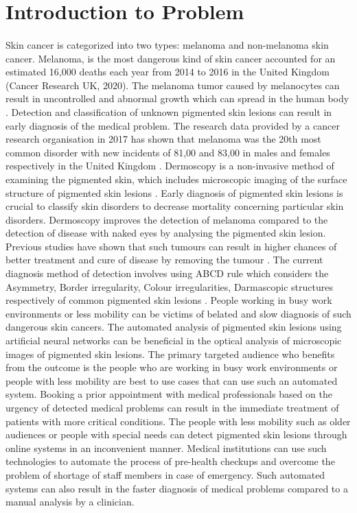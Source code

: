 \section{Introduction to Problem}
\paragraph*{}

Skin cancer is categorized into two types: melanoma and non-melanoma skin cancer. 
Melanoma, is the most dangerous kind of skin cancer accounted for an estimated 16,000 deaths 
each year from 2014 to 2016 in the United Kingdom (Cancer Research UK, 2020). 
The melanoma tumor caused by melanocytes can result in uncontrolled and abnormal growth which 
can spread in the human body \citep{KOROTKOV201269}.
Detection and classification of unknown pigmented skin lesions can result in early diagnosis 
of the medical problem. The research data provided by a cancer research organisation in 2017 has 
shown that melanoma was the 20th most common disorder with new incidents of 81,00 and 83,00 in males 
and females respectively in the United Kingdom \citep{KOROTKOV201269}. 
Dermoscopy is a non-invasive method of examining the pigmented skin, which includes microscopic imaging of the surface structure of pigmented
skin lesions \citep{KOROTKOV201269}.
Early diagnosis of pigmented skin lesions is crucial to classify skin disorders to decrease mortality concerning particular skin disorders. Dermoscopy improves the detection of melanoma compared to the detection of disease with naked eyes by analysing the pigmented skin lesion. Previous studies have shown that such tumours can result in higher chances of better treatment and cure of disease by removing the tumour \citep{CELEBI2007362}.
The current diagnosis method of detection involves using ABCD rule which considers the Asymmetry, Border irregularity, Colour irregularities, Darmascopic structures respectively of common pigmented skin lesions \citep{LOESCHER2013170}.
People working in busy work environments or less mobility can be victims of belated and slow diagnosis of such dangerous skin cancers.
The automated analysis of pigmented skin lesions using artificial neural networks can be beneficial in the optical analysis of microscopic images of pigmented skin lesions. 
The primary targeted audience who benefits from the outcome is the people who are working in busy work environments or people with less mobility are best to use cases that can use such an automated system. Booking a prior appointment with medical professionals based on the urgency of detected medical problems can result in the immediate treatment of patients with more critical conditions. The people with less mobility such as older audiences or people with special needs can detect pigmented skin lesions through online systems in an inconvenient manner. Medical institutions can use such technologies to automate the process of pre-health checkups and overcome the problem of shortage of staff members in case of emergency. Such automated systems can also result in the faster diagnosis of medical problems compared to a manual analysis by a clinician. 

